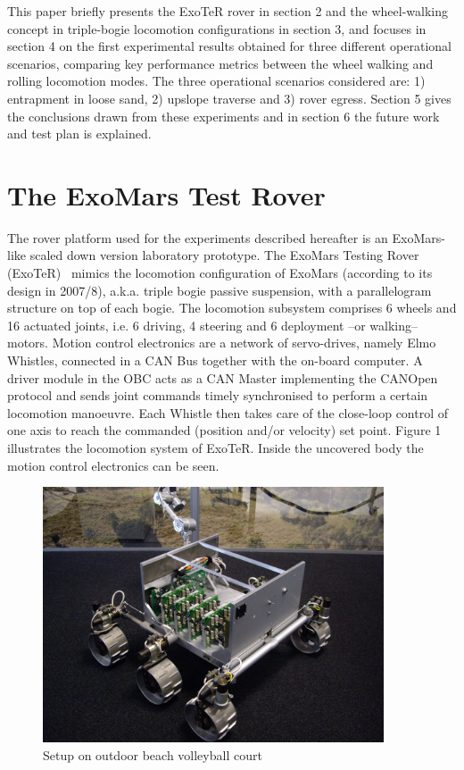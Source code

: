 \documentclass[a4paper,twocolumn]{esapub2005} %
\begin{document}
This paper briefly presents the ExoTeR rover in section 2 and the wheel-walking concept in triple-bogie locomotion configurations in section 3, and focuses in section 4 on the first experimental results obtained for three different operational scenarios, comparing key performance metrics between the wheel walking and rolling locomotion modes. The three operational scenarios considered are: 1) entrapment in loose sand, 2) upslope traverse and 3) rover egress. Section 5 gives the conclusions drawn from these experiments and in section 6 the future work and test plan is explained.



\section{The ExoMars Test Rover}
The rover platform used for the experiments described hereafter is an ExoMars-like scaled down version laboratory prototype. The ExoMars Testing Rover (ExoTeR)~\cite{Azkarate2015} mimics the locomotion configuration of ExoMars (according to its design in 2007/8), a.k.a. triple bogie passive suspension, with a parallelogram structure on top of each bogie. The locomotion subsystem comprises 6 wheels and 16 actuated joints, i.e. 6 driving, 4 steering and 6 deployment –or walking– motors. 
Motion control electronics are a network of servo-drives, namely Elmo Whistles, connected in a CAN Bus together with the on-board computer. A driver module in the OBC acts as a CAN Master implementing the CANOpen protocol and sends joint commands timely synchronised to perform a certain locomotion manoeuvre. Each Whistle then takes care of the close-loop control of one axis to reach the commanded (position and/or velocity) set point. 
Figure 1 illustrates the locomotion system of ExoTeR. Inside the uncovered body the motion control electronics can be seen.

\begin{figure}[h!]
	\centering		\includegraphics[width=0.9\textwidth]{ExoterRover2013.JPG}	
	\caption{Setup on outdoor beach volleyball court}
	\label{fig:volley}
\end{figure}
\end{document}
